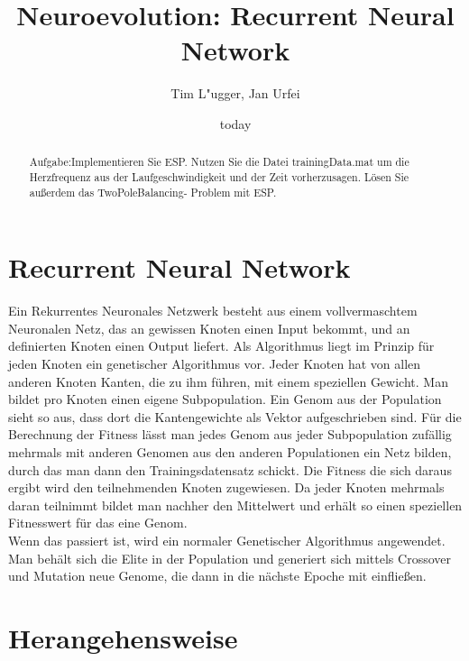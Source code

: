 \documentclass{hbrs-ecta-report}
\begin{document}

\title{Neuroevolution: Recurrent Neural Network}
\subtitle{}

\author{
\alignauthor
Tim L"ugger, Jan Urfei
}

\date{today}
\maketitle
\begin{abstract}
Aufgabe:Implementieren Sie ESP. Nutzen Sie die Datei trainingData.mat um die Herzfrequenz aus der Laufgeschwindigkeit und der Zeit vorherzusagen. Lösen Sie außerdem das TwoPoleBalancing- Problem mit ESP.
\end{abstract}

\section{Recurrent Neural Network}
Ein Rekurrentes Neuronales Netzwerk besteht aus einem vollvermaschtem Neuronalen Netz, das an gewissen Knoten einen Input bekommt, und an definierten Knoten einen Output liefert.
Als Algorithmus liegt im Prinzip für jeden Knoten ein genetischer Algorithmus vor. Jeder Knoten hat von allen anderen Knoten Kanten, die zu ihm führen, mit einem speziellen Gewicht. Man bildet pro Knoten einen eigene Subpopulation. Ein Genom aus der Population sieht so aus, dass dort die Kantengewichte als Vektor aufgeschrieben sind. Für die Berechnung der Fitness lässt man jedes Genom aus jeder Subpopulation zufällig mehrmals mit anderen Genomen aus den anderen Populationen ein Netz bilden, durch das man dann den Trainingsdatensatz schickt. Die Fitness die sich daraus ergibt wird den teilnehmenden Knoten zugewiesen. Da jeder Knoten mehrmals daran teilnimmt bildet man nachher den Mittelwert und erhält so einen speziellen Fitnesswert für das eine Genom.\\
Wenn das passiert ist, wird ein normaler Genetischer Algorithmus angewendet. Man behält sich die Elite in der Population und generiert sich mittels Crossover und Mutation neue Genome, die dann in die nächste Epoche mit einfließen. 


\section{Herangehensweise}
 
\end{document}
